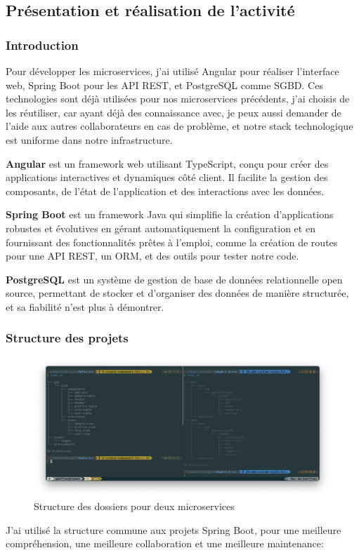 \documentclass[a4paper, 11pt]{report}
\begin{document}
\subsection{Présentation et réalisation de l'activité}
\subsubsection{Introduction}
Pour développer les microservices, j'ai utilisé Angular pour réaliser
l'interface web, Spring Boot pour les API REST, et PostgreSQL comme
SGBD. Ces technologies sont déjà utilisées pour nos microservices
précédents, j'ai choisis de les réutiliser, car ayant déjà des
connaissance avec, je peux aussi demander de l'aide aux autres
collaborateurs en cas de problème, et notre stack technologique est
uniforme dans notre infrastructure.

\textbf{Angular} est un framework web utilisant TypeScript, conçu pour
créer des applications interactives et dynamiques côté client. Il
facilite la gestion des composants, de l'état de l'application et des
interactions avec les données.

\textbf{Spring Boot} est un framework Java qui simplifie la création
d'applications robustes et évolutives en gérant automatiquement la
configuration et en fournissant des fonctionnalités prêtes à l'emploi,
comme la création de routes pour une API REST, un ORM, et des outils
pour tester notre code.

\textbf{PostgreSQL} est un système de gestion de base de données
relationnelle open source, permettant de stocker et d'organiser des
données de manière structurée, et sa fiabilité n'est plus à démontrer.
\subsubsection{Structure des projets}
  \begin{figure}[H]
      \centering
      \includegraphics[scale=0.35,center]{screenshots/directories.png}
      \caption{Structure des dossiers pour deux microservices}
  \end{figure}
J'ai utilisé la structure commune aux projets Spring Boot, pour une
meilleure compréhension, une meilleure collaboration et une meilleure
maintenance:
\end{document}
